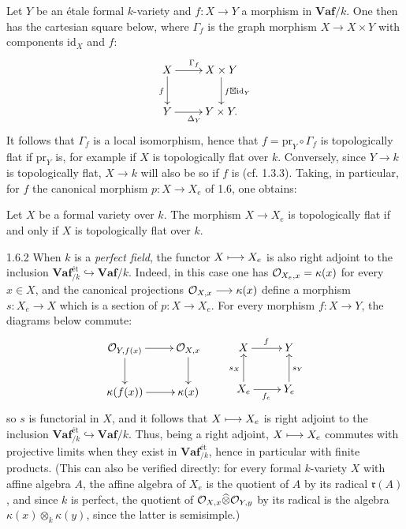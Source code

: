 Let $Y$ be an étale formal $k$-variety and $f:X\to Y$ a morphism in $\mathbf{Vaf}/k$. One then has the cartesian square below, where $\Gamma_f$ is the graph morphism $X\to X\times Y$ with components $\mathrm{id}_X$ and $f$:
\[
\xymatrix{X\ar[r]^{\Gamma_f}\ar[d]_f&X\times Y\ar[d]^{f\boxtimes\mathrm{id}_Y}\\
Y\ar[r]_{\Delta_Y}&Y\times Y.}
\]
It follows that $\Gamma_f$ is a local isomorphism, hence that $f=\mathrm{pr}_Y\circ\Gamma_f$ is topologically flat if $\mathrm{pr}_Y$ is, for example if $X$ is topologically flat over $k$.
Conversely, since $Y\to k$ is topologically flat, $X\to k$ will also be so if $f$ is (cf. 1.3.3). Taking, in particular, for $f$ the canonical morphism $p:X\to X_e$ of 1.6, one obtains:
\begin{proposition}{}
Let $X$ be a formal variety over $k$. The morphism $X\to X_e$ is topologically flat if and only if $X$ is topologically flat over $k$.
\end{proposition}
\begin{remark}{1.6.2}\label{VIIB.1.6.2}
When $k$ is a \emph{perfect field}, the functor $X\longmapsto X_e$ is also right adjoint to the inclusion $\mathbf{Vaf}_{/k}^{\text{ét}}\hookrightarrow\mathbf{Vaf}/k$. Indeed, in this case one has $\mathcal{O}_{X_e,x}=\kappa(x)$ for every $x\in X$, and the canonical projections $\mathcal{O}_{X,x}\longrightarrow\kappa(x)$ define a morphism $s:X_e\to X$ which is a section of $p:X\to X_e$. For every morphism $f:X\to Y$, the diagrams below commute:
\[
\xymatrix{\OO_{Y,f(x)}\ar[r]\ar[d]&\OO_{X,x}\ar[d]\\\kappa(f(x))\ar[r]&\kappa(x)}
\qquad
\xymatrix{X\ar[r]^f&Y\\X_e\ar[u]^{s_X}\ar[r]_{f_e}&Y_e\ar[u]_{s_Y}}
\]
so $s$ is functorial in $X$, and it follows that $X\longmapsto X_e$ is right adjoint to the inclusion $\mathbf{Vaf}_{/k}^{\text{ét}}\hookrightarrow\mathbf{Vaf}/k$. Thus, being a right adjoint, $X\longmapsto X_e$ commutes with projective limits when they exist in $\mathbf{Vaf}_{/k}^{\text{ét}}$, hence in particular with finite products. (This can also be verified directly: for every formal $k$-variety $X$ with affine algebra $A$, the affine algebra of $X_e$ is the quotient of $A$ by its radical $\mathfrak r(A)$, and since $k$ is perfect, the quotient of $\mathcal{O}_{X,x}\widehat\otimes\mathcal{O}_{Y,y}$ by its radical is the algebra $\kappa(x)\otimes_k\kappa(y)$, since the latter is semisimple.)
\end{remark}

